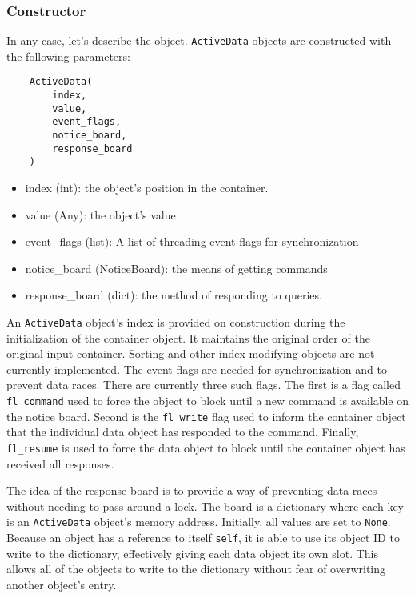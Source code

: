 \documentclass[10pt]{article}
\begin{document}
	\subsubsection{Constructor}
	In any case, let's describe the object. \lstinline|ActiveData| objects are constructed with the following parameters:
	
	\begin{lstlisting}
	ActiveData(
		index,
		value,
		event_flags,
		notice_board,
		response_board
	)
	\end{lstlisting}
	\begin{itemize}
		\item index (int): the object's position in the container.
		\item value (Any): the object's value
		\item event\_flags (list): A list of threading event flags for synchronization
		\item notice\_board (NoticeBoard): the means of getting commands
		\item response\_board (dict): the method of responding to queries.
	\end{itemize}
	
	An \lstinline|ActiveData| object's index is provided on construction during the initialization of the container object. It maintains the original order of the original input container. Sorting and other index-modifying objects are not currently implemented.
	The event flags are needed for synchronization and to prevent data races. There are currently three such flags. The first is a flag called \lstinline|fl_command| used to force the object to block until a new command is available on the notice board. Second is the \lstinline|fl_write| flag used to inform the container object that the individual data object has responded to the command. Finally, \lstinline|fl_resume| is used to force the data object to block until the container object has received all responses.
	
	The idea of the response board is to provide a way of preventing data races without needing to pass around a lock. The board is a dictionary where each key is an \lstinline|ActiveData| object's memory address. Initially, all values are set to \lstinline|None|. Because an object has a reference to itself \lstinline|self|, it is able to use its object ID to write to the dictionary, effectively giving each data object its own slot. This allows all of the objects to write to the dictionary without fear of overwriting another object's entry.
	
\end{document}
